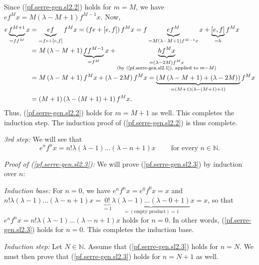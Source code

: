 \documentclass[etingof-lie.tex]{subfiles}
\begin{document}
Since (\ref{pf.serre-gen.sl2.2}) holds for $m=M$, we have $ef^{M}x=M\left(
\lambda-M+1\right)  f^{M-1}x$. Now,%
\begin{align*}
e\underbrace{f^{M+1}}_{=ff^{M}}x  &  =\underbrace{ef}_{=fe+\left[  e,f\right]
}f^{M}x=\left(  fe+\left[  e,f\right]  \right)  f^{M}x=f\underbrace{ef^{M}%
}_{=M\left(  \lambda-M+1\right)  f^{M-1}x}x+\underbrace{\left[  e,f\right]
}_{=h}f^{M}x\\
&  =M\left(  \lambda-M+1\right)  \underbrace{ff^{M-1}}_{=f^{M}}%
x+\underbrace{hf^{M}x}_{\substack{=\left(  \lambda-2M\right)  f^{M}%
x\\\text{(by (\ref{pf.serre-gen.sl2.1}), applied to }m=M\text{)}}}\\
&  =M\left(  \lambda-M+1\right)  f^{M}x+\left(  \lambda-2M\right)
f^{M}x=\underbrace{\left(  M\left(  \lambda-M+1\right)  +\left(
\lambda-2M\right)  \right)  }_{=\left(  M+1\right)  \left(  \lambda-\left(
M+1\right)  +1\right)  }f^{M}x\\
&  =\left(  M+1\right)  \left(  \lambda-\left(  M+1\right)  +1\right)  f^{M}x.
\end{align*}
Thus, (\ref{pf.serre-gen.sl2.2}) holds for $m=M+1$ as well. This completes the
induction step. The induction proof of (\ref{pf.serre-gen.sl2.2}) is thus complete.

\textit{3rd step:} We will see that%
\begin{equation}
e^{n}f^{n}x=n!\lambda\left(  \lambda-1\right)  ...\left(  \lambda-n+1\right)
x\ \ \ \ \ \ \ \ \ \ \text{for every }n\in\mathbb{N}.
\label{pf.serre-gen.sl2.3}%
\end{equation}


\textit{Proof of (\ref{pf.serre-gen.sl2.3}):} We will prove
(\ref{pf.serre-gen.sl2.3}) by induction over $n$:

\textit{Induction base:} For $n=0$, we have $e^{n}f^{n}x=e^{0}f^{0}x=x$ and
$n!\lambda\left(  \lambda-1\right)  ...\left(  \lambda-n+1\right)
x=\underbrace{0!}_{=1}\underbrace{\lambda\left(  \lambda-1\right)  ...\left(
\lambda-0+1\right)  }_{=\left(  \text{empty product}\right)  =1}x=x$, so that
$e^{n}f^{n}x=n!\lambda\left(  \lambda-1\right)  ...\left(  \lambda-n+1\right)
x$ holds for $n=0$. In other words, (\ref{pf.serre-gen.sl2.3}) holds for
$n=0$. This completes the induction base.

\textit{Induction step:} Let $N\in\mathbb{N}$. Assume that
(\ref{pf.serre-gen.sl2.3}) holds for $n=N$. We must then prove that
(\ref{pf.serre-gen.sl2.3}) holds for $n=N+1$ as well.
\end{document}
